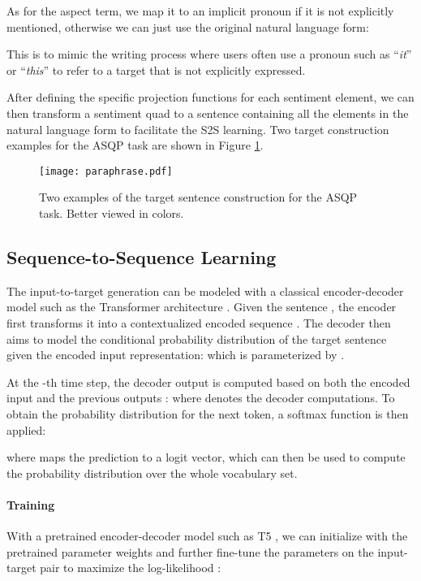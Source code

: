 \documentclass[11pt]{article}
\begin{document}
As for the aspect term, we map it to an implicit pronoun if it is not explicitly mentioned, otherwise we can just use the original natural language form:

This is to mimic the writing process where users often use a pronoun such as ``\textit{it}'' or ``\textit{this}'' to refer to a target that is not explicitly expressed. 

After defining the specific projection functions for each sentiment element, we can then transform a sentiment quad to a sentence containing all the elements in the natural language form to facilitate the S2S learning. Two target construction examples for the ASQP task are shown in Figure \ref{fig:paraphrase}. 


\begin{figure}
    \centering
    \texttt{[image: paraphrase.pdf]}
    \caption{Two examples of the target sentence construction for the ASQP task. Better viewed in colors.}
    \label{fig:paraphrase}
\end{figure}


\subsection{Sequence-to-Sequence Learning} \label{sec:seq2seq}
The input-to-target generation can be modeled with a classical encoder-decoder model such as the Transformer architecture \cite{nips17-transformer}. Given the sentence , the encoder first transforms it into a contextualized encoded sequence . The decoder then aims to model the conditional probability distribution of the target sentence  given the encoded input representation:  which is parameterized by . 

At the -th time step, the decoder output  is computed based on both the encoded input  and the previous outputs : 
where  denotes the decoder computations. To obtain the probability distribution for the next token, a softmax function is then applied:

where  maps the prediction  to a logit vector, which can then be used to compute the probability distribution over the whole vocabulary set.

\paragraph{Training}
With a pretrained encoder-decoder model such as T5 \cite{t5-paper}, we can initialize  with the pretrained parameter weights and further fine-tune the parameters on the input-target pair to maximize the log-likelihood :
\end{document}
